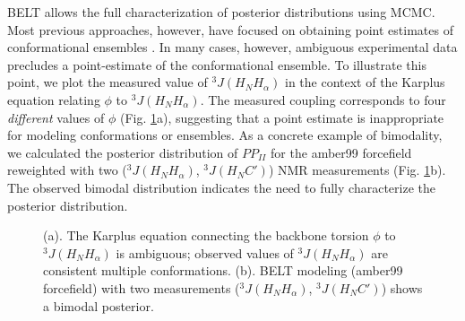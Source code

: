 \documentclass[journal=jacsat,manuscript=article]{achemso}
\begin{document}
BELT allows the full characterization of posterior distributions using MCMC.  Most previous approaches, however, have focused on obtaining point estimates of conformational ensembles \cite{rozycki2011saxs,  Graf2007}.  In many cases, however, ambiguous experimental data precludes a point-estimate of the conformational ensemble.  To illustrate this point, we plot the measured \cite{Graf2007} value of $^3J(H_NH_\alpha)$ in the context of the Karplus equation relating $\phi$ to $^3J(H_NH_\alpha)$.  The measured coupling corresponds to four \emph{different} values of $\phi$ (Fig. \ref{figure:Ambiguity}a), suggesting that a point estimate is inappropriate for modeling conformations or ensembles.  As a concrete example of bimodality, we calculated the posterior distribution of $PP_{II}$ for the amber99 forcefield reweighted with two ($^3J(H_NH_\alpha)$, $^3J(H_NC')$) NMR measurements (Fig. \ref{figure:Ambiguity}b).  The observed bimodal distribution indicates the need to fully characterize the posterior distribution.  

\begin{figure}
\caption{
(a).  The Karplus equation connecting the backbone torsion $\phi$ to $^3J(H_NH_\alpha)$ is ambiguous; observed values of $^3J(H_NH_\alpha)$ are consistent multiple conformations.  (b).  BELT modeling (amber99 forcefield) with two measurements ($^3J(H_NH_\alpha)$, $^3J(H_NC')$) shows a bimodal posterior.  
}
\label{figure:Ambiguity}

\end{figure}
\end{document}
